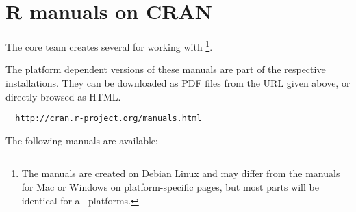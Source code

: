 
\chapter{R manuals on CRAN}


The \RR{} core team creates several
for working with \RR{}\footnote{
  The manuals are created on Debian Linux and may differ from the manuals for Mac
  or Windows on platform-specific pages, but most parts will be identical for
  all platforms.}.


The platform dependent versions of these manuals are part of the respective
\RR{} installations. They can be downloaded as PDF files from the URL given
above, or directly browsed as HTML.

\begin{verbatim}
  http://cran.r-project.org/manuals.html
\end{verbatim}


The following manuals are available:


